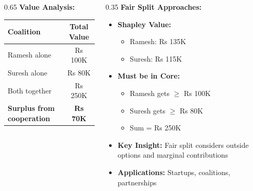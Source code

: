 \begin{frame}[fragile]
\begin{columns}
\begin{column}[T]{0.65\linewidth}
      \vspace{2pt}
      \textbf{Value Analysis:}
      \begin{center}
      \small
      \begin{tabular}{|l|c|}
        \hline
        \textbf{Coalition} & \textbf{Total Value} \\
        \hline
        Ramesh alone & Rs 100K \\
        Suresh alone & Rs 80K \\
        Both together & Rs 250K \\
        \hline
        \textbf{Surplus from cooperation} & \textbf{Rs 70K} \\
        \hline
      \end{tabular}
      \end{center}
    \end{column}
    \begin{column}[T]{0.35\linewidth}
      \textbf{Fair Split Approaches:}
      \begin{itemize}
        \item \textbf{Shapley Value:}
        \begin{itemize}
          \item Ramesh: Rs 135K
          \item Suresh: Rs 115K
        \end{itemize}
        \item \textbf{Must be in Core:}
        \begin{itemize}
          \item Ramesh gets $\geq$ Rs 100K
          \item Suresh gets $\geq$ Rs 80K
          \item Sum = Rs 250K
        \end{itemize}
        \item \textbf{Key Insight:} Fair split considers outside options and marginal contributions
        \item \textbf{Applications:} Startups, coalitions, partnerships
      \end{itemize}
    \end{column}
  \end{columns}
\end{frame}



